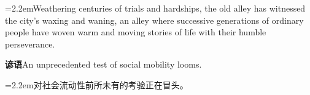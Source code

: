 \documentclass[11pt,a4paper]{article}
\newcommand{\num}[1]{\makebox[1.9em][r]{#1.}\hspace{0.3em}}
\begin{document}
\vspace{0.15em}

\noindent\hangindent=2.2em\hspace{2.2em}Weathering centuries of trials and hardships, the old alley has witnessed the city’s waxing and waning, an alley where successive generations of ordinary people have woven warm and moving stories of life with their humble perseverance.

\vspace{0.4em}\noindent{\color{rulegray}\rule{\textwidth}{0.6pt}}\vspace{0.4em}

\num{5}\textbf{谚语}\quad An unprecedented test of social mobility looms.

\vspace{0.15em}

\noindent\hangindent=2.2em\hspace{2.2em}对社会流动性前所未有的考验正在冒头。
\end{document}
